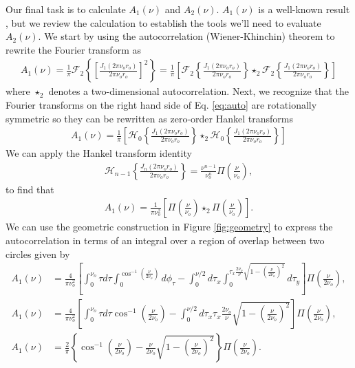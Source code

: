 \documentclass{osa-article}
\begin{document}
Our final task is to calculate $A_1(\nu)$ and $A_2(\nu)$. $A_1(\nu)$ is a
well-known result \cite{goodman1996, mertz2009}, but we review the calculation
to establish the tools we'll need to evaluate $A_2(\nu)$. We start by using the
autocorrelation (Wiener-Khinchin) theorem to rewrite the Fourier transform as
\begin{align}
  A_1(\nu) = \frac{1}{\pi}\mathcal{F}_2\left\{\left[\frac{J_1(2\pi\nu_o r_o)}{2\pi\nu_o r_o}\right]^2\right\} = \frac{1}{\pi}\left[\mathcal{F}_2\left\{\frac{J_1(2\pi\nu_o r_o)}{2\pi\nu_o r_o}\right\} \star_2 \mathcal{F}_2\left\{\frac{J_1(2\pi\nu_o r_o)}{2\pi\nu_o r_o}\right\}\right] \label{eq:auto}
\end{align}
where $\star_2$ denotes a two-dimensional autocorrelation. Next, we recognize
that the Fourier transforms on the right hand side of Eq. \ref{eq:auto} are
rotationally symmetric so they can be rewritten as zero-order Hankel transforms
\begin{align}
  A_1(\nu) = \frac{1}{\pi}\left[\mathcal{H}_0\left\{\frac{J_1(2\pi\nu_o r_o)}{2\pi\nu_o r_o}\right\} \star_2 \mathcal{H}_0\left\{\frac{J_1(2\pi\nu_o r_o)}{2\pi\nu_o r_o}\right\}\right] \label{eq:autoz}
\end{align}
We can apply the Hankel transform identity \cite{poul1998}
\begin{align}
  \mathcal{H}_{n-1}\left\{\frac{J_n(2\pi\nu_o r_o)}{2\pi\nu_o r_o}\right\} = \frac{\nu^{n-1}}{\nu_o^{n}}\Pi\left(\frac{\nu}{\nu_o}\right),\label{eq:identity}
\end{align}
to find that 
\begin{align}
  A_1(\nu) = \frac{1}{\pi\nu_o^{2}}\left[\Pi\left(\frac{\nu}{\nu_o}\right) \star_2 \Pi\left(\frac{\nu}{\nu_o}\right)\right] \label{eq:auto3}. 
\end{align}
We can use the geometric construction in Figure \ref{fig:geometry} to express the
autocorrelation in terms of an integral over a region of overlap between
two circles given by
\begin{align}
  A_1(\nu) &= \frac{4}{\pi\nu_o^{2}}\left[\int_0^{\nu_o}\tau d\tau\int_0^{\cos^{-1}\left(\frac{\nu}{2\nu_o}\right)}d\phi_{\tau} - \int_{0}^{\nu/2}d\tau_x\int_0^{\tau_x\frac{2\nu_o}{\nu}\sqrt{1 - \left(\frac{\nu}{2\nu_o}\right)^2}}d\tau_y\right]\Pi\left(\frac{\nu}{2\nu_o}\right),\\
  A_1(\nu) &= \frac{4}{\pi\nu_o^{2}}\left[\int_0^{\nu_o}\tau d\tau\cos^{-1}\left(\frac{\nu}{2\nu_o}\right) - \int_{0}^{\nu/2}d\tau_x\tau_x\frac{2\nu_o}{\nu}\sqrt{1 - \left(\frac{\nu}{2\nu_o}\right)^2}\right]\Pi\left(\frac{\nu}{2\nu_o}\right),\\
  A_1(\nu) &= \frac{2}{\pi}\left\{\cos^{-1}\left(\frac{\nu}{2\nu_o}\right) - \frac{\nu}{2\nu_o}\sqrt{1 - \left(\frac{\nu}{2\nu_o}\right)^2}\right\}\Pi\left(\frac{\nu}{2\nu_o}\right).
\end{align}
\end{document}
